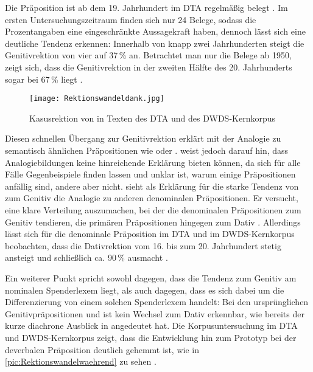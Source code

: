Die Präposition  ist ab dem 19. Jahrhundert im DTA regelmäßig belegt \citep[s.][]{Vieregge.2019}. 
Im ersten Untersuchungszeitraum finden sich nur 24 Belege, sodass die Prozentangaben eine eingeschränkte Aussagekraft haben, dennoch lässt sich eine deutliche Tendenz erkennen: 
Innerhalb von knapp zwei Jahrhunderten steigt die Genitivrektion von vier auf 37\,\% an. 
Betrachtet man nur die Belege ab 1950, zeigt sich, dass die Genitivrektion in der zweiten Hälfte des 20. Jahrhunderts sogar bei 67\,\% liegt \citep[s.][]{Vieregge.2019}. 

\begin{figure}
\centering
\texttt{[image: Rektionswandeldank.jpg]}
\caption{Kasusrektion von  in Texten des DTA und des DWDS-Kernkorpus \citep[s.][]{Vieregge.2019}}
\label{pic:Rektionswandeldank}
\end{figure}

Diesen schnellen Übergang zur Genitivrektion erklärt \citet[25]{Agel1992} mit der Analogie zu semantisch ähnlichen Präpositionen wie  oder . 
\citet[176]{DiMeola2004} weist jedoch darauf hin, dass Analogiebildungen keine hinreichende Erkl{\"a}rung bieten können, da sich für alle Fälle Gegenbeispiele finden lassen und unklar ist, warum einige Pr{\"a}positionen anf{\"a}llig sind, andere aber nicht. 
\citet[]{Eisenberg1979} sieht als Erklärung für die starke Tendenz von \dank{} zum Genitiv die Analogie zu anderen denominalen Präpositionen. 
Er versucht, eine klare Verteilung auszumachen, bei der die denominalen Pr{\"a}positionen zum Genitiv tendieren, die prim{\"a}ren Pr{\"a}positionen hingegen zum Dativ \citep[s.][519]{Eisenberg1979}. 
Allerdings lässt sich für die denominale Präposition  im DTA und im DWDS-Kernkorpus beobachten, dass die Dativrektion vom 16. bis zum 20. Jahrhundert stetig ansteigt und schließlich ca. 90\,\% ausmacht \citep[s.][]{Vieregge.2019}. 

Ein weiterer Punkt spricht sowohl dagegen, dass die Tendenz zum Genitiv am nominalen Spenderlexem liegt, als auch dagegen, dass es sich dabei um die Differenzierung von einem solchen Spenderlexem handelt: 
Bei den ursprünglichen Genitivpräpositionen \wegen{} und \waehrend{} ist kein Wechsel zum Dativ erkennbar, wie bereits der kurze diachrone Ausblick in \citet[]{DiMeola2000} angedeutet hat. 
Die Korpusuntersuchung im DTA und DWDS-Kernkorpus zeigt, dass die Entwicklung hin zum Prototyp bei der deverbalen Präposition \waehrend{} deutlich gehemmt ist, wie in \autoref{pic:Rektionswandelwaehrend} zu sehen \citep[s.][]{Vieregge.2019}.


